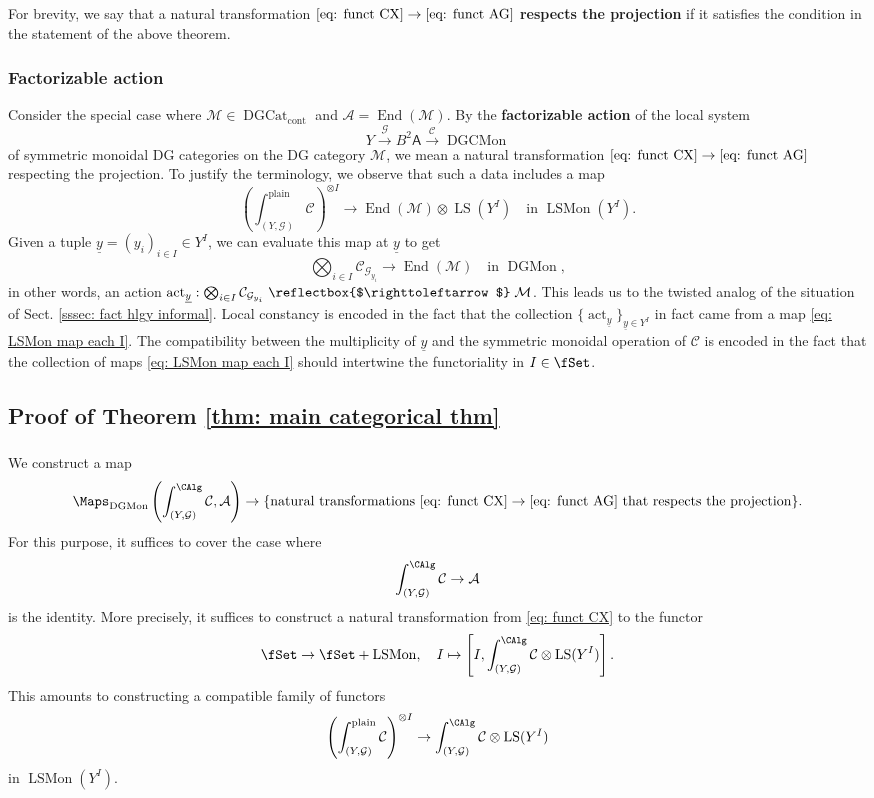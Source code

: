 \documentclass[10pt]{amsart}
\def\acts{\mathrel{\reflectbox{$\righttoleftarrow$}}}
\newcommand{\sssec}{\subsubsection}
\theoremstyle{remark}
\newcommand{\te}{\text}
\newcommand{\ul}{\underline}
\newcommand{\on}{\operatorname}
\newcommand{\cA}{\mathcal{A}}
\newcommand{\cC}{\mathcal{C}}
\newcommand{\cG}{\mathcal{G}}
\newcommand{\cM}{\mathcal{M}}
\newcommand{\DGcat}{\on{DGCat}_{\on{cont}}}
\newcommand{\LSMon}{\on{LSMon}}
\newcommand{\DGCatMon}{\on{DGMon}}
\newcommand{\DGCatSymMon}{\on{DGCMon}}
\newcommand{\LS}{\on{LS}}
\DeclareMathOperator{\End}{End}
\newcommand{\sfA}{\mathsf{A}}
\begin{document}
\sssec{}\label{sssec: respects the projection}
For brevity, we say that a natural transformation $\eqref{eq: funct CX} \rightarrow \eqref{eq: funct AG}$ \textbf{respects the projection} if it satisfies the condition in the statement of the above theorem.

\sssec{Factorizable action}
Consider the special case where $\cM\in\DGcat$ and $\cA=\End(\cM)$. By the \textbf{factorizable action} of the local system
\[Y\xrightarrow{\cG}B^2\sfA\xrightarrow{\cC}\DGCatSymMon\]
of symmetric monoidal DG categories on the DG category $\cM$, we mean a natural transformation $\eqref{eq: funct CX}\rightarrow\eqref{eq: funct AG}$ respecting the projection. To justify the terminology, we observe that such a data includes a map
\begin{equation}\label{eq: LSMon map each I}
    \left(\int^{\on{plain}}_{(Y,\cG)}\cC\right)^{\otimes I}\rightarrow \End(\cM)\otimes\LS(Y^I)\quad\te{in }\LSMon(Y^I).
\end{equation}
Given a tuple $\ul{y}=(y_i)_{i\in I}\in Y^I$, we can evaluate this map at $\ul{y}$ to get
\[\bigotimes_{i\in I}\cC_{\cG_{y_i}}\rightarrow \End(\cM)\quad\te{in }\DGCatMon,\]
in other words, an action $\on{act}_{\ul{y}}:\bigotimes_{i\in I}\cC_{\cG_{y_i}}\acts\cM$. This leads us to the twisted analog of the situation of Sect. \ref{sssec: fact hlgy informal}. Local constancy is encoded in the fact that the collection $\{\on{act}_{\ul{y}}\}_{\ul{y}\in Y^I}$ in fact came from a map \eqref{eq: LSMon map each I}. The compatibility between the multiplicity of $\ul{y}$ and the symmetric monoidal operation of $\cC$ is encoded in the fact that the collection of maps \eqref{eq: LSMon map each I} should intertwine the functoriality in $I\in\fSet$.

\subsection{Proof of Theorem \ref{thm: main categorical thm}}
\sssec{}
We construct a map
\[\Maps_{\DGCatMon}\left(\int^{\CAlg}_{(Y,\cG)}\cC, \cA\right)\rightarrow \{\text{natural transformations } \eqref{eq: funct CX}\rightarrow \eqref{eq: funct AG} \te{ that respects the projection}\}.\]
For this purpose, it suffices to cover the case where \[\int^{\CAlg}_{(Y,\cG)}\cC\rightarrow \cA\]
is the identity. More precisely, it suffices to construct a natural transformation from \eqref{eq: funct CX} to the functor
\[\fSet\rightarrow\fSet + \LSMon,\quad I\mapsto \left[I, \int^{\CAlg}_{(Y,\cG)}\cC\otimes \LS(Y^I)\right].\]
This amounts to constructing a compatible family of functors
\begin{equation}\label{eq: plain to CAlg}
    \left(\int^{\on{plain}}_{(Y,\cG)}\cC\right)^{\otimes I}\rightarrow \int^{\CAlg}_{(Y,\cG)}\cC \otimes \LS(Y^I)
\end{equation}
in $\LSMon(Y^I)$.
\medskip
\end{document}
